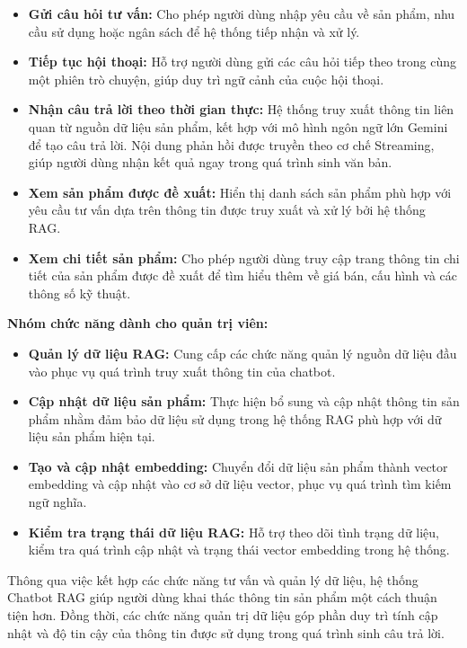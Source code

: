 \documentclass{report}
\begin{document}
\begin{itemize}
    \item \textbf{Gửi câu hỏi tư vấn:} Cho phép người dùng nhập yêu cầu về sản phẩm, nhu cầu sử dụng hoặc ngân sách để hệ thống tiếp nhận và xử lý.
    \item \textbf{Tiếp tục hội thoại:} Hỗ trợ người dùng gửi các câu hỏi tiếp theo trong cùng một phiên trò chuyện, giúp duy trì ngữ cảnh của cuộc hội thoại.
    \item \textbf{Nhận câu trả lời theo thời gian thực:} Hệ thống truy xuất thông tin liên quan từ nguồn dữ liệu sản phẩm, kết hợp với mô hình ngôn ngữ lớn Gemini để tạo câu trả lời. Nội dung phản hồi được truyền theo cơ chế Streaming, giúp người dùng nhận kết quả ngay trong quá trình sinh văn bản.
    \item \textbf{Xem sản phẩm được đề xuất:} Hiển thị danh sách sản phẩm phù hợp với yêu cầu tư vấn dựa trên thông tin được truy xuất và xử lý bởi hệ thống RAG.
    \item \textbf{Xem chi tiết sản phẩm:} Cho phép người dùng truy cập trang thông tin chi tiết của sản phẩm được đề xuất để tìm hiểu thêm về giá bán, cấu hình và các thông số kỹ thuật.
\end{itemize}

\textbf{Nhóm chức năng dành cho quản trị viên:}

\begin{itemize}
    \item \textbf{Quản lý dữ liệu RAG:} Cung cấp các chức năng quản lý nguồn dữ liệu đầu vào phục vụ quá trình truy xuất thông tin của chatbot.
    \item \textbf{Cập nhật dữ liệu sản phẩm:} Thực hiện bổ sung và cập nhật thông tin sản phẩm nhằm đảm bảo dữ liệu sử dụng trong hệ thống RAG phù hợp với dữ liệu sản phẩm hiện tại.
    \item \textbf{Tạo và cập nhật embedding:} Chuyển đổi dữ liệu sản phẩm thành vector embedding và cập nhật vào cơ sở dữ liệu vector, phục vụ quá trình tìm kiếm ngữ nghĩa.
    \item \textbf{Kiểm tra trạng thái dữ liệu RAG:} Hỗ trợ theo dõi tình trạng dữ liệu, kiểm tra quá trình cập nhật và trạng thái vector embedding trong hệ thống.
\end{itemize}

Thông qua việc kết hợp các chức năng tư vấn và quản lý dữ liệu, hệ thống Chatbot RAG giúp người dùng khai thác thông tin sản phẩm một cách thuận tiện hơn. Đồng thời, các chức năng quản trị dữ liệu góp phần duy trì tính cập nhật và độ tin cậy của thông tin được sử dụng trong quá trình sinh câu trả lời.
\end{document}
